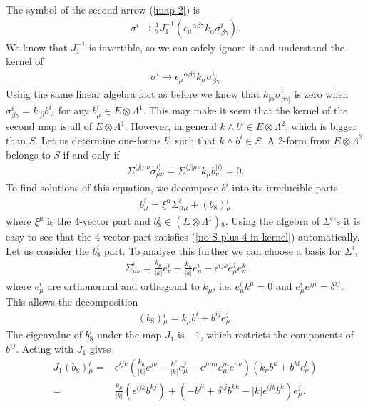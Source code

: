 \documentclass[10pt]{report}
\theoremstyle{definition}
\begin{document}
The symbol of the second arrow (\ref{map-2}) is
\begin{align}\label{symbol-2}
\sigma^i \to \frac{1}{2} J_1^{-1} (\epsilon_\mu{}^{\alpha\beta\gamma} k_\alpha \sigma^i_{\beta\gamma}).
\end{align}
We know that $J_1^{-1}$ is invertible, so we can safely ignore it and understand the kernel of 
\begin{align}
    \sigma^i \to \epsilon_\mu{}^{\alpha\beta\gamma} k_\alpha \sigma^i_{\beta\gamma}
\end{align}
Using the same linear algebra fact as before we know that $k_{[\alpha} \sigma^i_{\beta\gamma]}$ is zero when $\sigma^i_{\beta \gamma} = k_{[\beta} b^i_{\gamma]}$ for any $b^i_\mu \in E \otimes \Lambda^1$. This may make it seem that the kernel of the second map is all of $E \otimes \Lambda^1$. However, in general $k \wedge b^i \in E \otimes \Lambda^2$, which is bigger than $S$. Let us determine one-forms $b^i$ such that $k\wedge b^i \in S$. 
A 2-form from $E\otimes \Lambda^2$ belongs to $S$ if and only if 
\begin{align}\label{no-S-plus-4-in-kernel}
\Sigma^{\langle j|\mu\nu} \sigma^{i\rangle}_{\mu\nu} = \Sigma^{\langle j|\mu\nu} k_\mu b^{|i\rangle}_\nu = 0.
\end{align}
To find solutions of this equation, we decompose $b^i$ into its irreducible parts
\begin{align}
b^i_\mu = \xi^\alpha \Sigma^i_{\alpha\mu} + (b_8){}^i_\mu
\end{align}
where $\xi^\mu$ is the 4-vector part and $b^i_8\in (E\otimes\Lambda^1){}_8$.
Using the algebra of $\Sigma^i$'s it is easy to see that the 4-vector part satisfies (\ref{no-S-plus-4-in-kernel}) automatically. Let us consider the $b^i_8$ part. To analyse this further we can choose a basis for $\Sigma^i$,
\begin{align}\label{self-dual-2-forms-k-basis}
\Sigma^i_{\mu\nu} = \frac{k_\mu}{|k|} e^i_\nu - \frac{k_\nu}{|k|} e^i_\mu - \epsilon^{ijk} e^j_\mu e^k_\nu
\end{align}
where $e^i_\mu$ are orthonormal and orthogonal to $k_\mu$, i.e. $e^i_\mu k^\mu = 0$ and $e^i_\mu e^{j\mu} = \delta^{ij}$.
This allows the decomposition 
\begin{align}
(b_8){}^i_\mu = k_\mu b^i + b^{ij} e^j_\mu.
\end{align}
The eigenvalue of $b_8^i$ under the map $J_1$ is $-1$, which restricts the components of $b^{ij}$. Acting with $J_1$ gives
\begin{align}\label{J1-b}
J_1(b_8){}^i_\mu =& \epsilon^{ijk}\left(\frac{k_\mu}{|k|} e^{j\nu} - \frac{k^\nu}{|k|} e^j_\mu - \epsilon^{jmn} e^m_\mu e^{n\nu}\right)(k_\nu b^k + b^{kl} e^l_\nu) \\ =& \frac{k_\mu}{|k|} \left( \epsilon^{ijk} b^{kj} \right) + \left( -b^{ji} + \delta^{ij} b^{kk} - |k| \epsilon^{ijk} b^k \right) e^j_\mu.
\end{align}
\end{document}
